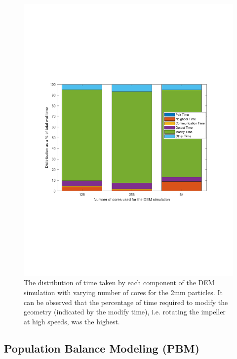 \documentclass[preprint,11pt,authoryear]{elsarticle}
\begin{document}
\begin{figure}
\centering
\includegraphics[scale=0.6]{rslsts_DEM_profle_mtlb.pdf}
\caption{The distribution of time taken by each component of the DEM 
simulation with varying number of cores for the 2mm particles. It 
can be observed that the percentage of time required to modify the 
geometry (indicated by the modify time), i.e. rotating the impeller 
at high speeds, was the highest.}
\label{fig:rslts_DEM_percent_plot}
\end{figure}


\subsection{Population Balance Modeling (PBM)}
\end{document}
